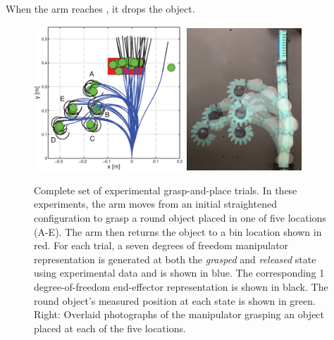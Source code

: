 When the arm reaches , it drops the object.

\begin{figure}[htbp]
\begin{centering}
  \includegraphics[width=0.5\textwidth]{Figures/experimental_results/allTestsOverlaid.eps}
\includegraphics[width=0.385\textwidth]{figures/experimental_results/five_grasps.jpg}
\caption[Left: All 25 experimental grasping trials.]{Complete set of experimental grasp-and-place trials. In these experiments, the arm moves from an initial straightened configuration to grasp a round object placed in one of five locations (A-E). The arm then returns the object to a bin location shown in red. For each trial, a seven degrees of freedom manipulator representation is generated at both the \emph{grasped} and \emph{released} state using experimental data and is shown in blue. The corresponding 1 degree-of-freedom end-effector representation is shown in black. The round object's measured position at each state is shown in green. Right: Overlaid photographs of the manipulator grasping an object placed at each of the five locations. }\label{fig:allTestsOverlaid}
\end{centering}
\end{figure}

